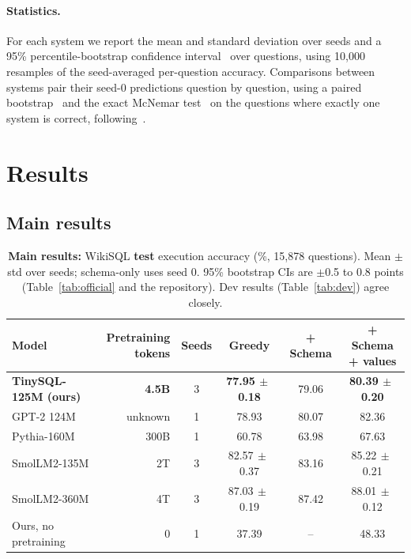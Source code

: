 \documentclass[11pt]{article}
\newcommand{\pmstd}[2]{#1{\scriptsize$\,\pm\,$#2}}
\begin{document}
\paragraph{Statistics.} For each system we report the mean and standard deviation over seeds and a 95\% percentile-bootstrap confidence interval~\cite{efron1993bootstrap} over questions, using 10,000 resamples of the seed-averaged per-question accuracy. Comparisons between systems pair their seed-0 predictions question by question, using a paired bootstrap~\cite{koehn2004significance} and the exact McNemar test~\cite{mcnemar1947} on the questions where exactly one system is correct, following~\cite{dror2018hitchhiker}.

\section{Results}
\label{sec:results}

\subsection{Main results}

\begin{table}[t]
\centering
\small
\begin{tabular}{lrcccc}
\toprule
Model & \shortstack[r]{Pretraining\\tokens} & Seeds & Greedy & + Schema & \shortstack{+ Schema\\+ values} \\
\midrule
\textbf{TinySQL-125M (ours)} & \textbf{4.5B} & 3 & \textbf{\pmstd{77.95}{0.18}} & 79.06 & \textbf{\pmstd{80.39}{0.20}} \\
GPT-2 124M & unknown & 1 & 78.93 & 80.07 & 82.36 \\
Pythia-160M & 300B & 1 & 60.78 & 63.98 & 67.63 \\
SmolLM2-135M & 2T & 3 & \pmstd{82.57}{0.37} & 83.16 & \pmstd{85.22}{0.21} \\
SmolLM2-360M & 4T & 3 & \pmstd{87.03}{0.19} & 87.42 & \pmstd{88.01}{0.12} \\
\midrule
Ours, no pretraining & 0 & 1 & 37.39 & -- & 48.33 \\
\bottomrule
\end{tabular}
\caption{\textbf{Main results:} WikiSQL \textbf{test} execution accuracy (\%, 15,878 questions). Mean $\pm$ std over seeds; schema-only uses seed 0. 95\% bootstrap CIs are $\pm$0.5 to 0.8 points (Table~\ref{tab:official} and the repository). Dev results (Table~\ref{tab:dev}) agree closely.}
\label{tab:main}
\end{table}
\end{document}
